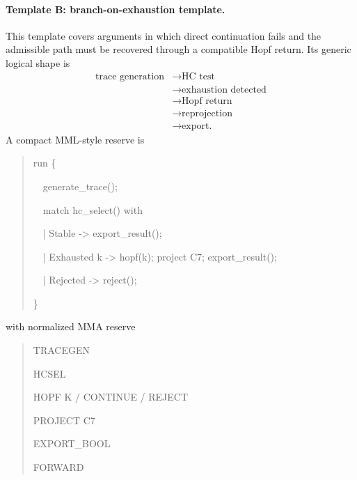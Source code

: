 \paragraph{Template B: branch-on-exhaustion template.}
This template covers arguments in which direct continuation fails and the admissible path must be recovered through a compatible Hopf return. Its generic logical shape is
\[
\begin{aligned}
\text{trace generation}
&\to \text{HC test}\\
&\to \text{exhaustion detected}\\
&\to \text{Hopf return}\\
&\to \text{reprojection}\\
&\to \text{export.}
\end{aligned}
\]
A compact MML-style reserve is
\begin{quote}
\ttfamily
run \{\par
\ \ generate\_trace();\par
\ \ match hc\_select() with\par
\ \ | Stable      -> export\_result();\par
\ \ | Exhausted k -> hopf(k); project C7; export\_result();\par
\ \ | Rejected    -> reject();\par
\}\par
\end{quote}
with normalized MMA reserve
\begin{quote}
\ttfamily
TRACEGEN \par
HCSEL \par
HOPF K / CONTINUE / REJECT \par
PROJECT C7 \par
EXPORT\_BOOL \par
FORWARD
\end{quote}

